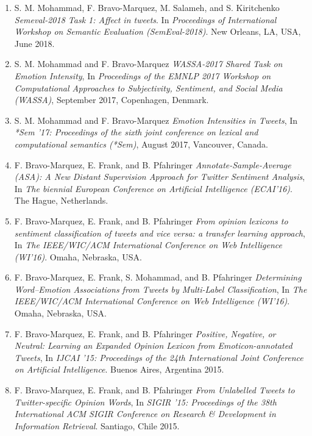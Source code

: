 \documentclass[letterpaper]{article}
\begin{document}
\begin{enumerate}

\item S. M. Mohammad, F. Bravo-Marquez, M. Salameh, and S. Kiritchenko \textit{Semeval-2018 Task 1: Affect in tweets}. In \textit{Proceedings of International Workshop on Semantic Evaluation (SemEval-2018)}. New Orleans, LA, USA, June 2018. 

\item  S. M. Mohammad and F. Bravo-Marquez \textit{WASSA-2017 Shared Task on Emotion Intensity}, In \textit{Proceedings of the EMNLP 2017 Workshop on Computational Approaches to Subjectivity, Sentiment, and Social Media (WASSA)}, September 2017, Copenhagen, Denmark. 

\item S. M. Mohammad and F. Bravo-Marquez \textit{Emotion Intensities in Tweets}, In \textit{*Sem '17: Proceedings of the sixth joint conference on lexical and computational semantics (*Sem)}, August 2017, Vancouver, Canada. 


\item F. Bravo-Marquez, E. Frank, and B. Pfahringer \textit{Annotate-Sample-Average (ASA): A New Distant
Supervision Approach for Twitter Sentiment Analysis}, In \textit{The biennial European Conference  on Artificial Intelligence (ECAI'16)}. The Hague, Netherlands.


\item F. Bravo-Marquez, E. Frank, and B. Pfahringer \textit{From opinion lexicons to sentiment classification of
tweets and vice versa: a transfer learning approach}, In \textit{The IEEE/WIC/ACM International Conference on Web Intelligence (WI'16)}. Omaha, Nebraska, USA.


\item F. Bravo-Marquez, E. Frank, S. Mohammad, and B. Pfahringer \textit{Determining Word--Emotion Associations from Tweets by Multi-Label Classification}, In \textit{The IEEE/WIC/ACM International Conference on Web Intelligence (WI'16)}. Omaha, Nebraska, USA.

\item F. Bravo-Marquez, E. Frank, and B. Pfahringer \textit{Positive, Negative, or Neutral: Learning an Expanded Opinion Lexicon from Emoticon-annotated Tweets}, In \textit{IJCAI '15: Proceedings of the 24th International Joint Conference on Artificial Intelligence}. Buenos Aires, Argentina 2015.

\item F. Bravo-Marquez, E. Frank, and B. Pfahringer \textit{From Unlabelled Tweets to Twitter-specific Opinion Words}, In \textit{SIGIR '15: Proceedings of the 38th International ACM SIGIR Conference on Research \& Development in Information Retrieval}. Santiago, Chile 2015. 


\end{enumerate}
\end{document}

